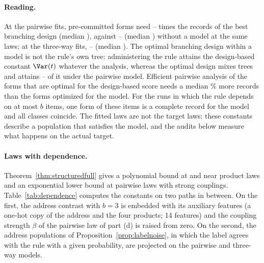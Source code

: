 \paragraph{Reading.}
At the pairwise fits, pre-committed forms need \nModelTwoLo--\nModelTwoHi{} times the records of the best branching design (median \nModelTwoMed), against \nModelDesignLo--\nModelDesignHi{} (median \nModelDesignMed) without a model at the same laws; at the three-way fits, \nModelThreeLo--\nModelThreeHi{} (median \nModelThreeMed). The optimal branching design within a model is not the rule's own tree: administering the rule attains the design-based constant $\Var(t)$ whatever the analysis, whereas the optimal design mixes trees and attains \nModelTwoBrLo--\nModelTwoBrHi{} of it under the pairwise model. Efficient pairwise analysis of the forms that are optimal for the design-based score needs a median \nModelTwoDesForms\% more records than the forms optimized for the model. For the runs in which the rule depends on at most $b$ items, one form of these items is a complete record for the model and all classes coincide. The fitted laws are not the target laws: these constants describe a population that satisfies the model, and the audits below measure what happens on the actual target.

\paragraph{Laws with dependence.}
Theorem~\ref{thm:structuredfull} gives a polynomial bound at and near product laws and an exponential lower bound at pairwise laws with strong couplings. Table~\ref{tab:dependence} computes the constants on two paths in between. On the first, the address contrast with $b=3$ is embedded with its auxiliary features (a one-hot copy of the address and the four products; 14 features) and the coupling strength $\beta$ of the pairwise law of part (d) is raised from zero. On the second, the address populations of Proposition~\ref{prop:labelnoise}, in which the label agrees with the rule with a given probability, are projected on the pairwise and three-way models.

\nDependenceAppendixText

